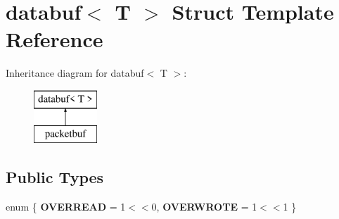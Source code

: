 \hypertarget{structdatabuf}{}\section{databuf$<$ T $>$ Struct Template Reference}
\label{structdatabuf}
Inheritance diagram for databuf$<$ T $>$\+:\begin{figure}[H]
\begin{center}
\leavevmode
\includegraphics[height=2.000000cm]{structdatabuf}
\end{center}
\end{figure}
\subsection*{Public Types}
\begin{DoxyCompactItemize}
\item 
\mbox{\label{structdatabuf_a9f408ad611db258c6fc64595f7174563}} 
enum \{ {\bfseries O\+V\+E\+R\+R\+E\+AD} = 1$<$$<$0, 
{\bfseries O\+V\+E\+R\+W\+R\+O\+TE} = 1$<$$<$1
 \}
\end{DoxyCompactItemize}
